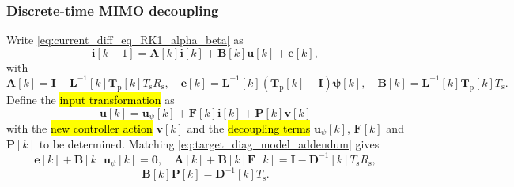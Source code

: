 \begin{frame}
    \frametitle{Discrete-time MIMO decoupling}
    Write \eqref{eq:current_diff_eq_RK1_alpha_beta} as
    \begin{equation}
        \bm{i}[k+1]=\bm{A}[k]\bm{i}[k]+\bm{B}[k]\bm{u}[k]+\bm{e}[k],
    \end{equation}\pause%
    with
    \begin{equation}
        \bm{A}[k]=\bm{I}-\bm{L}^{-1}[k]\bm{T}_\mathrm{p}[k]T_\mathrm{s}R_\mathrm{s},\quad
        \bm{e}[k]=\bm{L}^{-1}[k](\bm{T}_\mathrm{p}[k]-\bm{I})\bm{\psi}[k],\quad
        \bm{B}[k]=\bm{L}^{-1}[k]\bm{T}_\mathrm{p}[k]T_\mathrm{s}.
    \end{equation}\pause%
    Define the \hl{input transformation} as
    \begin{equation}
        \bm{u}[k]=\bm{u}_{\psi}[k]+\bm{F}[k]\bm{i}[k]+\bm{P}[k]\bm{v}[k]
    \end{equation}
    with the \hl{new controller action} $\bm{v}[k]$ and the \hl{decoupling terms} $\bm{u}_{\psi}[k]$, $\bm{F}[k]$ and $\bm{P}[k]$ to be determined. \pause Matching \eqref{eq:target_diag_model_addendum} gives
    \begin{equation}
        \bm{e}[k]+\bm{B}[k]\bm{u}_{\psi}[k]=\bm{0},\quad
        \bm{A}[k]+\bm{B}[k]\bm{F}[k]=\bm{I}-\bm{D}^{-1}[k]T_\mathrm{s}R_\mathrm{s},
    \end{equation}
    \begin{equation}
        \bm{B}[k]\bm{P}[k]=\bm{D}^{-1}[k]T_\mathrm{s} .
    \end{equation}
\end{frame}

